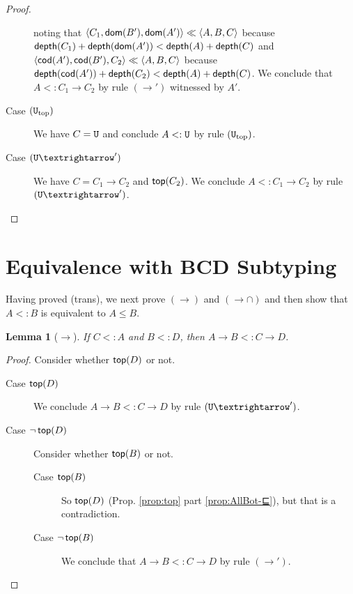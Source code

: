 \documentclass{article}
\newtheorem{lemma}[theorem]{Lemma}
\begin{document}
\begin{proof}
\begin{description}
\[    \]
    noting that
    $\langle C_1, \mathsf{dom}(B'), \mathsf{dom}(A') \rangle \ll \langle A, B, C \rangle$
    because $\mathsf{depth}(C_1) + \mathsf{depth}(\mathsf{dom}(A')) < \mathsf{depth}(A) + \mathsf{depth}(C)$
    and
    $\langle \mathsf{cod}(A'), \mathsf{cod}(B'), C_2 \rangle \ll \langle A, B, C \rangle$
    because $\mathsf{depth}(\mathsf{cod}(A')) + \mathsf{depth}(C_2) < \mathsf{depth}(A) + \mathsf{depth}(C)$.
    We conclude that $A <: C_1 → C_2$ by rule $(→')$ witnessed by $A'$.
  \item[Case $(\mathtt{U}_{\mathrm{top}})$] We have $C = \mathtt{U}$ and
    conclude $A <: \mathtt{U}$ by rule $(\mathtt{U}_{\mathrm{top}})$.
  \item[Case $(\TOP{→}')$] We have $C = C_1 → C_2$ and $\mathsf{top}(C_2)$.
    We conclude $A <: C_1 → C_2$ by rule $(\TOP{→}')$.
  \end{description}
\end{proof}


\section{Equivalence with BCD Subtyping}
\label{sec:equiv}

Having proved (trans), we next prove $(→)$ and $({→}{∩})$
and then show that $A <: B$ is equivalent to $A ≤ B$.

\begin{lemma}[$→$]\label{lem:⊑-fun′}
  If $C <: A$ and $B <: D$, then
  $A → B <: C → D$.
\end{lemma}
\begin{proof}
  Consider whether $\mathsf{top}(D)$ or not.
  \begin{description}
  \item[Case $\mathsf{top}(D)$] We conclude $A → B <: C → D$
    by rule $(\TOP{→}')$.
  \item[Case $\neg \,\mathsf{top}(D)$]
    Consider whether $\mathsf{top}(B)$ or not.
    \begin{description}
    \item[Case $\mathsf{top}(B)$] So $\mathsf{top}(D)$ (Prop. \ref{prop:top}
      part \ref{prop:AllBot-⊑}), but that is a contradiction.
    \item[Case $\neg\,\mathsf{top}(B)$]
      We conclude that $A → B <: C → D$ by rule $(→')$.
    \end{description}
  \end{description}
\end{proof}
\end{document}
